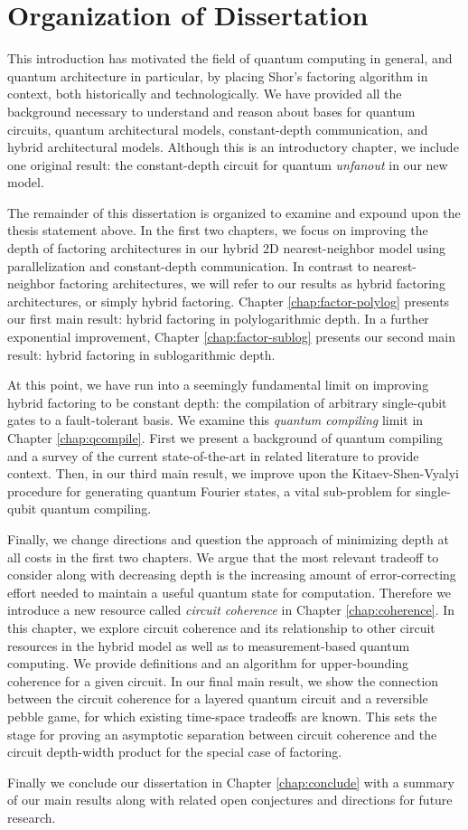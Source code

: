 \section{Organization of Dissertation}
\label{sec:intro-conclude}

This introduction has motivated the field of quantum computing in
general, and quantum architecture in particular, by placing
Shor's factoring algorithm in context, both historically and
technologically. We have provided all the background necessary
to understand and reason about bases for quantum circuits,
quantum architectural models, constant-depth communication,
and hybrid architectural models. Although this is an
introductory chapter, we include one original result:
the constant-depth circuit for
quantum \emph{unfanout} in our new model.

The remainder of this dissertation is organized to
examine and expound upon the thesis statement above. In the first two
chapters, we focus on improving the depth of factoring architectures
in our hybrid 2D nearest-neighbor model using parallelization and
constant-depth communication. In contrast to nearest-neighbor factoring
architectures, we will refer to our results as hybrid factoring architectures,
or simply hybrid factoring.
Chapter \ref{chap:factor-polylog} presents our first main result:
hybrid factoring in polylogarithmic depth.
In a further exponential improvement, Chapter \ref{chap:factor-sublog} presents 
our second main result: hybrid factoring in sublogarithmic depth.

At this point, we have run into a seemingly fundamental limit on improving
hybrid factoring to be constant depth: the compilation of arbitrary
single-qubit gates to a fault-tolerant basis. We examine this
\emph{quantum compiling} limit in Chapter \ref{chap:qcompile}. First we
present a background of quantum compiling and a survey of the current
state-of-the-art in related literature to provide context. Then, in our
third main result, we improve
upon the Kitaev-Shen-Vyalyi procedure for generating quantum Fourier states,
a vital sub-problem for single-qubit quantum compiling.

Finally, we change directions and question the approach of minimizing depth
at all costs in the first two chapters. We argue that the most relevant
tradeoff to consider along with decreasing depth is the increasing amount
of error-correcting effort needed to maintain a useful quantum state for
computation. Therefore we introduce a new resource called
\emph{circuit coherence} in Chapter \ref{chap:coherence}. In this chapter,
we explore circuit coherence and its relationship to other circuit resources
in the hybrid model as well as to measurement-based quantum computing.
We provide definitions and an algorithm for upper-bounding coherence for
a given circuit. In our final
main result, we show the connection between the circuit coherence for a
layered quantum circuit and a reversible pebble game, for which existing
time-space tradeoffs are known. This sets the stage for proving an
asymptotic separation between circuit coherence and the circuit
depth-width product for the special case of factoring.

Finally we conclude our dissertation in Chapter \ref{chap:conclude} with a
summary of our main results along with related open conjectures and
directions for future research.